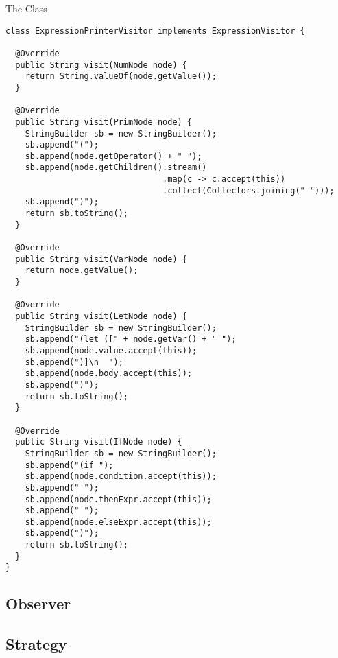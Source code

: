 \begin{cl}{The  Class}
\begin{lstlisting}[language=MyJava]
class ExpressionPrinterVisitor implements ExpressionVisitor {

  @Override
  public String visit(NumNode node) {
    return String.valueOf(node.getValue());
  }
  
  @Override
  public String visit(PrimNode node) {
    StringBuilder sb = new StringBuilder();
    sb.append("(");
    sb.append(node.getOperator() + " ");
    sb.append(node.getChildren().stream()
                                .map(c -> c.accept(this))
                                .collect(Collectors.joining(" ")));
    sb.append(")");
    return sb.toString();
  }
  
  @Override
  public String visit(VarNode node) {
    return node.getValue();
  }
  
  @Override
  public String visit(LetNode node) {
    StringBuilder sb = new StringBuilder();
    sb.append("(let ([" + node.getVar() + " ");
    sb.append(node.value.accept(this));
    sb.append(")]\n  ");
    sb.append(node.body.accept(this));
    sb.append(")");
    return sb.toString();
  }
  
  @Override
  public String visit(IfNode node) {
    StringBuilder sb = new StringBuilder();
    sb.append("(if ");
    sb.append(node.condition.accept(this));
    sb.append(" ");
    sb.append(node.thenExpr.accept(this));
    sb.append(" ");
    sb.append(node.elseExpr.accept(this));
    sb.append(")");
    return sb.toString();
  }
}
\end{lstlisting}
\end{cl}

\subsection*{Observer}

\subsection*{Strategy}